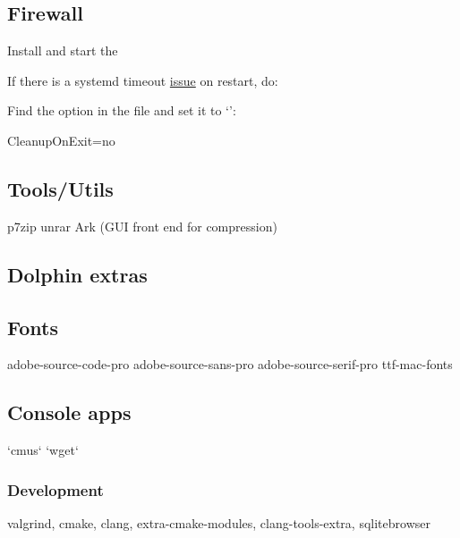 \subsection{Firewall}

Install  and start the 

If there is a systemd timeout \href{https://bugzilla.redhat.com/show_bug.cgi?id=1294415#c10}{issue} on restart, do:

\begin{blocksection}
	Find the  option in the file and set it to `':\\
	\begin{codeblock}
		CleanupOnExit=no
	\end{codeblock}
\end{blocksection}

\subsection{Tools/Utils}

p7zip
unrar
Ark (GUI front end for compression)

\subsection{Dolphin extras}


\subsection{Fonts}

adobe-source-code-pro
adobe-source-sans-pro
adobe-source-serif-pro
ttf-mac-fonts

\subsection{Console apps}

`cmus`
`wget`

\subsubsection{Development}

valgrind, cmake, clang, extra-cmake-modules, clang-tools-extra, 
sqlitebrowser

